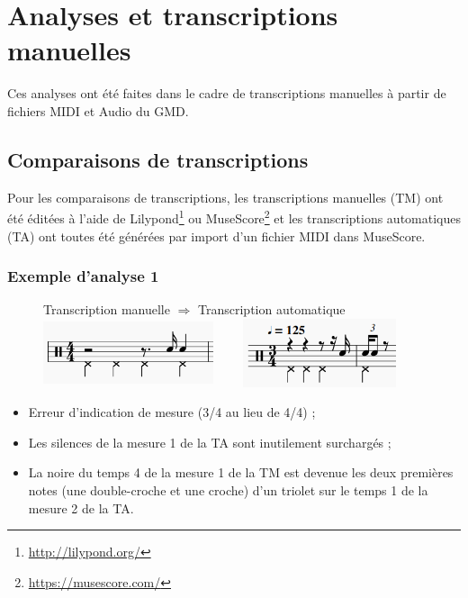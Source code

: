 \section{Analyses et transcriptions manuelles}
\label{analyses_et_TM}
Ces analyses ont été faites dans le cadre de transcriptions manuelles à partir
de fichiers MIDI et Audio du GMD.

\subsection*{Comparaisons de transcriptions}
Pour les comparaisons de transcriptions, les transcriptions manuelles (TM) ont
été éditées à l’aide de Lilypond\footnote{\url{http://lilypond.org/}} ou
MuseScore\footnote{\url{https://musescore.com/}} et les transcriptions
automatiques (TA) ont toutes été générées par import d’un fichier MIDI dans
MuseScore.

\subsubsection{Exemple d’analyse 1}
\begin{figure}[h]
\centering
Transcription manuelle $\Rightarrow$ Transcription automatique
\includegraphics[height=20mm, width=50mm]{
z_images/4_experimentations/1_analyses/0_drummer1_session3/1_manuelle.png}
\ \ \ \ 
\includegraphics[height=20mm, width=45mm]{
z_images/4_experimentations/1_analyses/0_drummer1_session3/0_musescore.png}
\end{figure}
\begin{itemize}
	\item Erreur d’indication de mesure (3/4 au lieu de 4/4) ;
	\item Les silences de la mesure 1 de la TA sont inutilement surchargés ;
	\item La noire du temps 4 de la mesure 1 de la TM est devenue les deux
        premières notes (une double-croche et une croche) d’un triolet sur le
        temps 1 de la mesure 2 de la TA.
\end{itemize}


